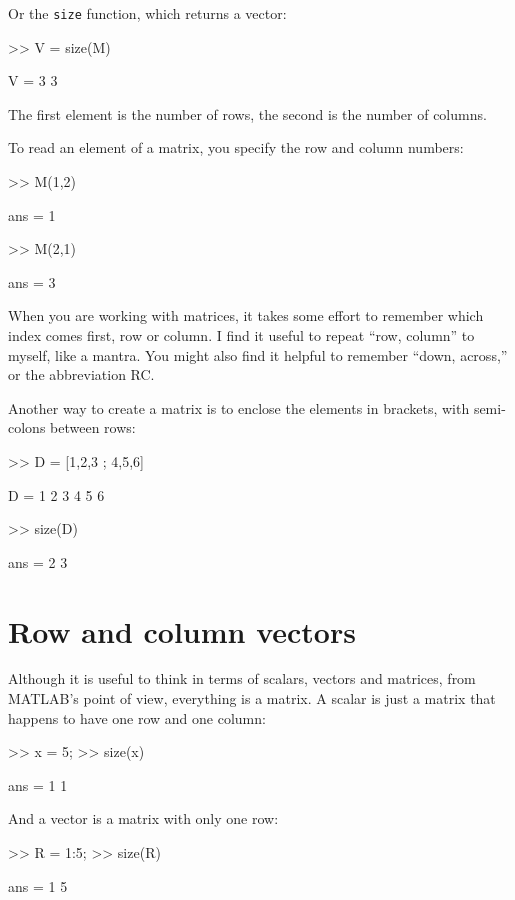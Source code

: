 \documentclass[
]{book}
\numberwithin{Answer}{chapter}
\numberwithin{Exercise}{chapter}
\begin{document}
Or the {\tt size} function, which returns a vector:


\begin{code}
>> V = size(M)

V = 3     3
\end{code}

The first element is the number of rows, the second is the number of
columns.

To read an element of a matrix, you specify the row and column numbers:

\begin{code}
>> M(1,2)

ans = 1

>> M(2,1)

ans = 3
\end{code}

When you are working with matrices, it takes some effort to remember
which index comes first, row or column.  I find it useful to repeat
``row, column'' to myself, like a mantra.  You might also find it
helpful to remember ``down, across,'' or the abbreviation RC.

Another way to create a matrix is to enclose the elements in
brackets, with semi-colons between rows:

\begin{code}
>> D = [1,2,3 ; 4,5,6]

D =  1     2     3
     4     5     6

>> size(D)

ans = 2     3
\end{code}


\section{Row and column vectors}
\label{rowvector}

Although it is useful to think in terms of scalars, vectors and matrices,
from MATLAB's point of view, everything is a matrix.  A scalar
is just a matrix that happens to have one row and one column:

\begin{code}
>> x = 5;
>> size(x)

ans = 1     1
\end{code}

And a vector is a matrix with only one row:

\begin{code}
>> R = 1:5;
>> size(R)

ans = 1     5
\end{code}
\end{document}
